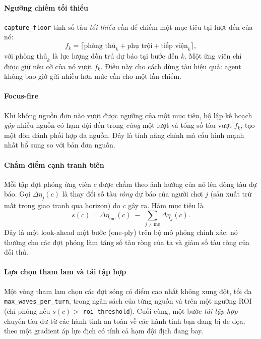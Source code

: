 \documentclass[conference]{IEEEtran}
\begin{document}
\paragraph{Ngưỡng chiếm tối thiểu} \texttt{capture\_floor} tính số tàu \emph{tối thiểu} cần để chiếm một mục tiêu tại lượt đến của nó:
\begin{equation}
f_k = \big\lceil \text{phòng thủ}_k + \text{phụ trội} + \text{tiếp viện}_k \big\rceil,
\end{equation}
với $\text{phòng thủ}_k$ là lực lượng đồn trú dự báo tại bước đến $k$. Một ứng viên chỉ được giữ nếu cỡ của nó vượt $f_k$. Điều này cho cách dùng tàu hiệu quả: agent không bao giờ gửi nhiều hơn mức cần cho một lần chiếm.

\paragraph{Focus-fire} Khi không nguồn đơn nào vượt được ngưỡng của một mục tiêu, bộ lập kế hoạch \emph{gộp} nhiều nguồn có hạm đội đến trong \emph{cùng} một lượt và tổng số tàu vượt $f_k$, tạo một đòn đánh phối hợp đa nguồn. Đây là tính năng chính mà cấu hình mạnh nhất bổ sung so với bản đơn nguồn.

\paragraph{Chấm điểm cạnh tranh biên} Mỗi tập đợt phóng ứng viên $c$ được chấm theo ảnh hưởng của nó lên dòng tàu dự báo. Gọi $\Delta\eta_j(c)$ là thay đổi số tàu \emph{ròng} dự báo của người chơi $j$ (sản xuất trừ mất trong giao tranh qua horizon) do $c$ gây ra. Hàm mục tiêu là
\begin{equation}
\label{eq:comp}
s(c) = \Delta\eta_{\mathrm{me}}(c) \;-\; \sum_{j \neq \mathrm{me}} \Delta\eta_j(c).
\end{equation}
Đây là một look-ahead một bước (one-ply) trên bộ mô phỏng chính xác: nó thưởng cho các đợt phóng làm tăng số tàu ròng của ta và giảm số tàu ròng của đối thủ.

\paragraph{Lựa chọn tham lam và tái tập hợp} Một vòng tham lam chọn các đợt sóng có điểm cao nhất không xung đột, tối đa \texttt{max\_waves\_per\_turn}, trong ngân sách của từng nguồn và trên một ngưỡng ROI (chỉ phóng nếu $s(c)>$ \texttt{roi\_threshold}). Cuối cùng, một bước \emph{tái tập hợp} chuyển tàu dư từ các hành tinh an toàn về các hành tinh bạn đang bị đe dọa, theo một gradient áp lực địch có tính cả hạm đội địch đang bay.
\end{document}
